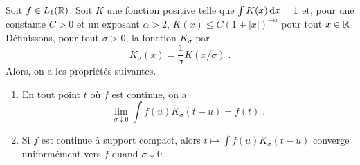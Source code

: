 \begin{lemma}\label{lem:regularisation}
  Soit $f\in L_1(\mathbb{R})$.
  Soit $K$ une fonction positive telle que $\int K(x)\,\mathrm{d} x=1$ et, pour une
  constante $C>0$ et un exposant $\alpha>2$, $K(x)\leq C (1+|x|)^{-\alpha}$
  pour tout $x\in\mathbb{R}$.  D{\'e}finissons, pour tout $\sigma>0$, la fonction
  $K_\sigma$ par
\begin{equation}
  \label{eq:Kband}
  K_\sigma(x)=\frac1\sigma K(x/\sigma)\;.
\end{equation}
Alors, on a les propri{\'e}t{\'e}s suivantes.
\begin{enumerate}[label=(\roman*)]
\item\label{item:regularisation1} En tout point $t$ o{\`u} $f$ est continue, on a
$$
\lim_{\sigma\downarrow0}  \int f(u) K_\sigma(t-u) = f(t)\;.
$$
\item\label{item:regularisation2} Si $f$ est continue {\`a} support compact, alors
  $t \mapsto \int f(u) K_\sigma(t-u)$ converge uniform{\'e}ment vers $f$ quand $\sigma\downarrow0$.
\end{enumerate}
\end{lemma}
